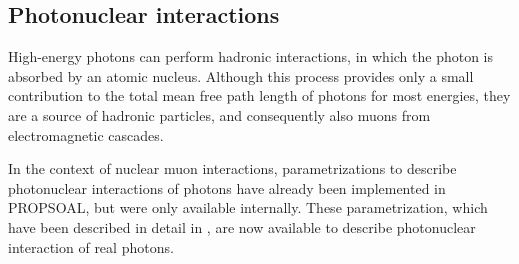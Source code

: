 \subsection{Photonuclear interactions}

High-energy photons can perform hadronic interactions, in which the photon is absorbed by an atomic nucleus.
Although this process provides only a small contribution to the total mean free path length of photons for most energies, they are a source of hadronic particles, and consequently also muons from electromagnetic cascades.

In the context of nuclear muon interactions, parametrizations to describe photonuclear interactions of photons have already been implemented in PROPSOAL, but were only available internally.
These parametrization, which have been described in detail in \cite{KOEHNE20132070}, are now available to describe photonuclear interaction of real photons.

